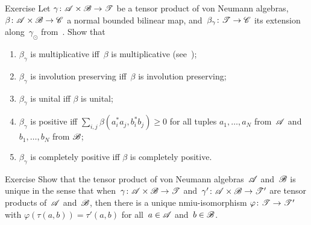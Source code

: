 \documentclass[a]{subfiles}
\begin{document}
\begin{parsec}%
\begin{point}{Exercise}%
Let $\gamma\colon \mathscr{A}\times \mathscr{B}\to\mathscr{T}$
be a tensor product
of von Neumann algebras,
  $\beta\colon \mathscr{A}\times \mathscr{B}\to\mathscr{C}$
 a normal bounded bilinear map,
 and~$\beta_\gamma\colon \mathscr{T}\to\mathscr{C}$
 its extension along~$\gamma_\odot$
from~.
Show that
\begin{enumerate}
\item
$\beta_\gamma$
is multiplicative iff~$\beta$ is multiplicative
(see~);
\item 
$\beta_\gamma$ 
is involution preserving iff~$\beta$ is involution preserving;
\item
$\beta_\gamma$ is unital
iff $\beta$ is unital;
\item
$\beta_\gamma$ is positive
iff
$\sum_{i,j} \beta(a_i^*a_j,b_i^*b_j) \geq 0$
for all tuples $a_1,\dotsc,a_N$
from~$\mathscr{A}$ and $b_1,\dotsc,b_N$ from $\mathscr{B}$;
\item
$\beta_\gamma$ is completely positive iff
$\beta$ is completely positive.
\end{enumerate}

\end{point}
\begin{point}{Exercise}%
Show that the tensor product of von Neumann algebras~$\mathscr{A}$
and~$\mathscr{B}$ is unique in
the sense
that when~$\gamma\colon \mathscr{A}\times \mathscr{B}\to\mathscr{T}$
and~$\gamma'\colon \mathscr{A}\times \mathscr{B}\to\mathscr{T}'$
are tensor products of~$\mathscr{A}$ and~$\mathscr{B}$,
then there is a unique
nmiu-isomorphism $\varphi\colon \mathscr{T}\to\mathscr{T}'$
with $\varphi(\tau(a,b))=\tau'(a,b)$
for all~$a\in\mathscr{A}$ and~$b\in\mathscr{B}$.
\end{point}
\end{parsec}
\end{document}

